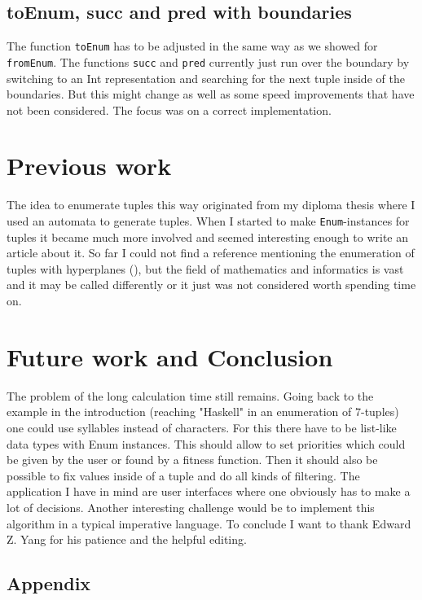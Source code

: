 \documentclass{tmr}
\begin{document}
\subsection{toEnum, succ and pred with boundaries}
The function \verb|toEnum| has to be adjusted in the same way as we showed for \verb|fromEnum|.
The functions \verb|succ| and \verb|pred| currently just run over the boundary by switching 
to an Int representation and searching for the next tuple inside of the boundaries.
But this might change as well as some speed improvements that have not been considered.
The focus was on a correct implementation.

\section{Previous work}
The idea to enumerate tuples this way originated from my diploma thesis where I used an automata
to generate tuples. When I started to make \verb|Enum|-instances for tuples it became 
much more involved and seemed interesting enough to write an article about it.
So far I could not find a reference mentioning the enumeration of tuples with 
hyperplanes (\eg \cite{knuth}), but the field of mathematics and informatics is vast and 
it may be called differently or it just was not considered worth spending time on.

\section{Future work and Conclusion}
The problem of the long calculation time still remains. Going back to the example in the 
introduction (reaching "Haskell" in an enumeration of 7-tuples) one could use syllables 
instead of characters. For this there have to be list-like data types with Enum instances. 
This should allow to set priorities which could be given by the user or found by a 
fitness function. Then it should also be possible to fix values inside of a tuple and do 
all kinds of filtering.
The application I have in mind are user interfaces where one obviously has to make a lot 
of decisions.
Another interesting challenge would be to implement this algorithm in a typical imperative language.
To conclude I want to thank Edward Z. Yang for his patience and the helpful editing.

\subsection{Appendix}
\end{document}
